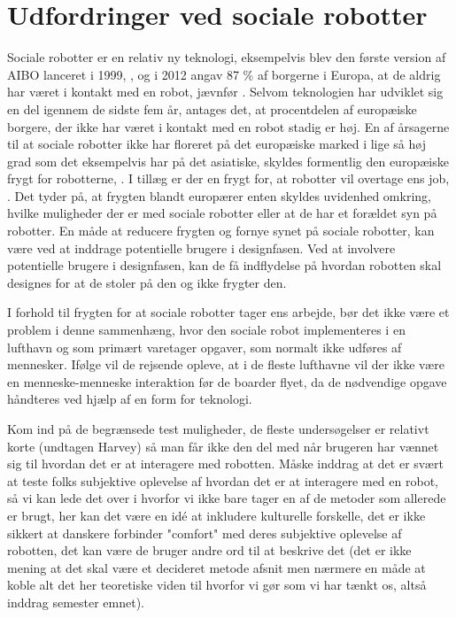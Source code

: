 \section{Udfordringer ved sociale robotter}
\label{UdfordringerSocialeRobotter}
%
Sociale robotter er en relativ ny teknologi, eksempelvis blev den første version af AIBO lanceret i 1999, \textcite{WEB:AIBO}, og i 2012 angav 87 \% af borgerne i Europa, at de aldrig har været i kontakt med en robot, jævnfør . Selvom teknologien har udviklet sig en del igennem de sidste fem år, antages det, at procentdelen af europæiske borgere, der ikke har været i kontakt med en robot stadig er høj. En af årsagerne til at sociale robotter ikke har floreret på det europæiske marked i lige så høj grad som det eksempelvis har på det asiatiske, skyldes formentlig den europæiske frygt for robotterne, \parencite[s. 28]{PDF:InTheCompanyofRobots}. I tillæg er der en frygt for, at robotter vil overtage ens job, \parencite[s. 42]{PDF:PerceptionAcceptance}. Det tyder på, at frygten blandt europærer enten skyldes uvidenhed omkring, hvilke muligheder der er med sociale robotter eller at de har et forældet syn på robotter. En måde at reducere frygten og fornye synet på sociale robotter, kan være ved at inddrage potentielle brugere i designfasen. Ved at involvere potentielle brugere i designfasen, kan de få indflydelse på hvordan robotten skal designes for at de stoler på den og ikke frygter den.      

I forhold til frygten for at sociale robotter tager ens arbejde, bør det ikke være et problem i denne sammenhæng, hvor den sociale robot implementeres i en lufthavn og som primært varetager opgaver, som normalt ikke udføres af mennesker. Ifølge \textcite[s. 352]{PDF:TheImpactOfTraveler} vil de rejsende opleve, at i de fleste lufthavne vil der ikke være en menneske-menneske interaktion før de boarder flyet, da de nødvendige opgave håndteres ved hjælp af en form for teknologi. \blankline
%




 Kom ind på de begrænsede test muligheder, de fleste undersøgelser er relativt korte (undtagen Harvey) så man får ikke den del med når brugeren har vænnet sig til hvordan det er at interagere med robotten.  \blankline
%
Måske inddrag at det er svært at teste folks subjektive oplevelse af hvordan det er at interagere med en robot, så vi kan lede det over i hvorfor vi ikke bare tager en af de metoder som allerede er brugt, her kan det være en idé at inkludere kulturelle forskelle, det er ikke sikkert at danskere forbinder "comfort" med deres subjektive oplevelse af robotten, det kan være de bruger andre ord til at beskrive det (det er ikke mening at det skal være et decideret metode afsnit men nærmere en måde at koble alt det her teoretiske viden til hvorfor vi gør som vi har tænkt os, altså inddrag semester emnet).\blankline
%

